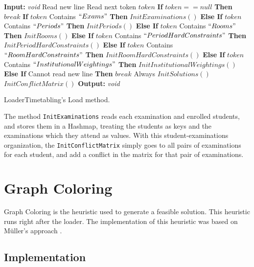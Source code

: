 \begin{algorithm}[b!]
\begin{algorithmic}
\State \textbf{Input:} \textit{void} 
\State Read new line
\Repeat
	\State Read next token $token$
	\State \textbf{If} $token == null$ \textbf{Then} $break$ 
	\State \textbf{If} $token$ Contains $``Exams"$ \textbf{Then} $InitExaminations()$
	\State \textbf{Else If} $token$ Contains $``Periods"$ \textbf{Then} $InitPeriods()$
	\State \textbf{Else If} $token$ Contains $``Rooms"$ \textbf{Then} $InitRooms()$
	\State \textbf{Else If} $token$ Contains $``PeriodHardConstraints"$ \textbf{Then} $InitPeriodHardConstraints()$
	\State \textbf{Else If} $token$ Contains $``RoomHardConstraints"$ \textbf{Then} $InitRoomHardConstraints()$
	\State \textbf{Else If} $token$ Contains $``InstitutionalWeightings"$ \textbf{Then} $InitInstitutionalWeightings()$
	\State \textbf{Else If} Cannot read new line \textbf{Then} $break$ 
\Until Always
\State $InitSolutions()$
\State $InitConflictMatrix()$
\State \textbf{Output:} \textit{void} 
\end{algorithmic}
\caption{LoaderTimetabling's Load method.}
\label{alg:Load}
\end{algorithm}The method \verb+InitExaminations+ reads each examination and enrolled students, and stores them in a Hashmap, treating the students as keys and the examinations which they attend as values. With this student-examinations organization, the \verb+InitConflictMatrix+ simply goes to all pairs of examinations for each student, and add a conflict in the matrix for that pair of examinations.

\section{Graph Coloring}
\label{sec:GraphColoring}

Graph Coloring is the heuristic used to generate a feasible solution. This heuristic runs right after the loader. The implementation of this heuristic was based on M\"{u}ller's approach \cite{Mueller2009}.\\

\subsection{Implementation}

